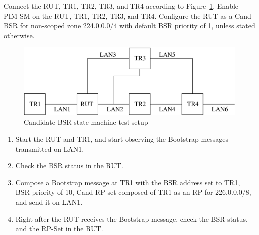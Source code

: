 \documentclass[11pt]{report}
\begin{document}
Connect the RUT, TR1, TR2, TR3, and TR4 according to
Figure~\ref{fig:pim_test_6_1_candidate_bsr_state_machine}.
Enable PIM-SM on the RUT, TR1, TR2, TR3, and TR4. Configure the RUT
as a Cand-BSR for non-scoped zone 224.0.0.0/4 with default BSR
priority of 1, unless stated otherwise.

\begin{figure}[htbp]
  \begin{center}
    \includegraphics[scale=0.8]{figs/pim_test_6_1_candidate_bsr_state_machine}
    \caption{Candidate BSR state machine test setup}
    \label{fig:pim_test_6_1_candidate_bsr_state_machine}
  \end{center}
\end{figure}



\begin{enumerate}

  \item Start the RUT and TR1, and start observing the Bootstrap messages
  transmitted on LAN1.

  \item Check the BSR status in the RUT.

  \item Compose a Bootstrap message at TR1 with the BSR address set to TR1,
  BSR priority of 10, Cand-RP set composed of TR1 as an RP for 226.0.0.0/8,
  and send it on LAN1.

  \item Right after the RUT receives the Bootstrap message, check the BSR
  status, and the RP-Set in the RUT.

\end{enumerate}

\end{document}

